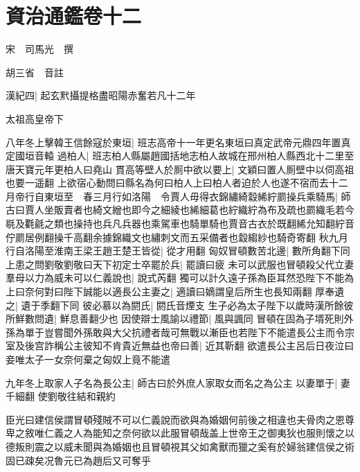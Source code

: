 \chapter{資治通鑑卷十二}
宋　司馬光　撰

胡三省　音註

漢紀四|{
	起玄黓攝提格盡昭陽赤奮若凡十二年}


太祖高皇帝下

八年冬上擊韓王信餘寇於東垣|{
	班志高帝十一年更名東垣曰真定武帝元鼎四年置真定國垣音轅}
過柏人|{
	班志柏人縣屬趙國括地志柏人故城在邢州柏人縣西北十二里至唐天寶元年更柏人曰堯山}
貫高等壁人於厠中欲以要上|{
	文穎曰置人厠壁中以伺高祖也要一遥翻}
上欲宿心動問曰縣名為何曰柏人上曰柏人者迫於人也遂不宿而去十二月帝行自東垣至　春三月行如洛陽　令賈人毋得衣錦繡綺縠絺紵罽操兵乘騎馬|{
	師古曰賈人坐販賣者也綺文繒也即今之細綾也絺細葛也紵織紵為布及疏也罽織毛若今毼及氍毹之類也操持也兵凡兵器也乘駕車也騎單騎也賈音古衣於既翻絺允知翻紵音佇罽居例翻操千高翻余據錦織文也繡刺文而五采備者也縠縐紗也騎奇寄翻}
秋九月行自洛陽至淮南王梁王趙王楚王皆從|{
	從才用翻}
匈奴冒頓數苦北邊|{
	數所角翻下同}
上患之問劉敬劉敬曰天下初定士卒罷於兵|{
	罷讀曰疲}
未可以武服也冒頓殺父代立妻羣母以力為威未可以仁義說也|{
	說式芮翻}
獨可以計久遠子孫為臣耳然恐陛下不能為上曰奈何對曰陛下誠能以適長公主妻之|{
	適讀曰嫡謂皇后所生也長知兩翻}
厚奉遺之|{
	遺于季翻下同}
彼必慕以為閼氏|{
	閼氏音煙支}
生子必為太子陛下以歲時漢所餘彼所鮮數問遺|{
	鮮息善翻少也}
因使辯士風諭以禮節|{
	風與諷同}
冒頓在固為子壻死則外孫為單于豈嘗聞外孫敢與大父抗禮者哉可無戰以漸臣也若陛下不能遣長公主而令宗室及後宫詐稱公主彼知不肯貴近無益也帝曰善|{
	近其靳翻}
欲遣長公主呂后日夜泣曰妾唯太子一女奈何棄之匈奴上竟不能遣

九年冬上取家人子名為長公主|{
	師古曰於外庶人家取女而名之為公主}
以妻單于|{
	妻千細翻}
使劉敬往結和親約

臣光曰建信侯謂冒頓殘賊不可以仁義說而欲與為婚姻何前後之相違也夫骨肉之恩尊卑之敘唯仁義之人為能知之奈何欲以此服冒頓哉盖上世帝王之御夷狄也服則懷之以德叛則震之以威未聞與為婚姻也且冒頓視其父如禽獸而獵之奚有於婦翁建信侯之術固已疎矣况魯元已為趙后又可奪乎


